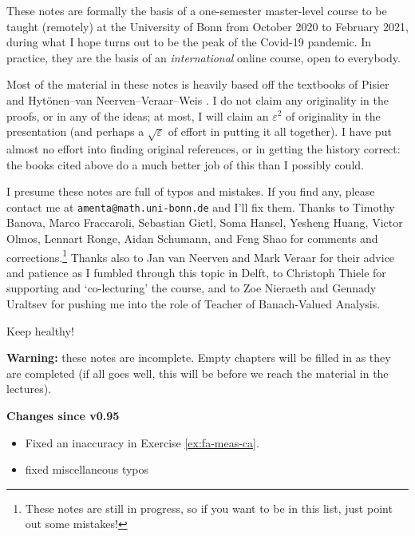 These notes are formally the basis of a one-semester master-level course to be taught (remotely) at the University of Bonn from October 2020 to February 2021, during what I hope turns out to be the peak of the Covid-19 pandemic.
In practice, they are the basis of an \emph{international} online course, open to everybody.

Most of the material in these notes is heavily based off the textbooks of Pisier \cite{gP16} and Hyt\"onen--van Neerven--Veraar--Weis \cite{HNVW16, HNVW17}.
I do not claim any originality in the proofs, or in any of the ideas; at most, I will claim an $\varepsilon^2$ of originality in the presentation (and perhaps a $\sqrt{\varepsilon}$ of effort in putting it all together).
I have put almost no effort into finding original references, or in getting the history correct: the books cited above do a much better job of this than I possibly could.

\vspace{1cm}

I presume these notes are full of typos and mistakes.
If you find any, please contact me at \texttt{amenta@math.uni-bonn.de} and I'll fix them.
Thanks to Timothy Banova, Marco Fraccaroli, Sebastian Gietl, Soma Hansel, Yesheng Huang, Victor Olmos, Lennart Ronge, Aidan Schumann, and Feng Shao for comments and corrections.\footnote{These notes are still in progress, so if you want to be in this list, just point out some mistakes!}
Thanks also to Jan van Neerven and Mark Veraar for their advice and patience as I fumbled through this topic in Delft, to Christoph Thiele for supporting and `co-lecturing' the course, and to Zoe Nieraeth and Gennady Uraltsev for pushing me into the role of Teacher of Banach-Valued Analysis.

\vspace{0.5cm}

Keep healthy! 




\vspace{1cm}

\textbf{Warning:} these notes are incomplete.
Empty chapters will be filled in as they are completed (if all goes well, this will be before we reach the material in the lectures).

\textbf{Changes since v0.95}
\begin{itemize}
\item Fixed an inaccuracy in Exercise \ref{ex:fa-meas-ca}.
\item fixed miscellaneous typos
\end{itemize}

